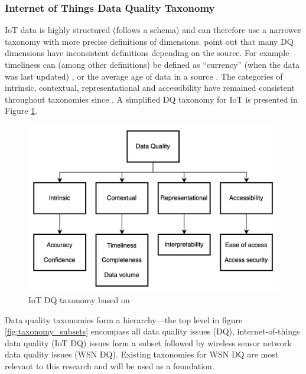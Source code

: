 \subsubsection{Internet of Things Data Quality Taxonomy}
IoT data is highly structured (follows a schema) and can therefore use a narrower taxonomy with more precise definitions of dimensions. \cite{karkouchDataQualityInternet2016} point out that many DQ dimensions have inconsistent definitions depending on the source. For example timeliness can (among other definitions) be defined as “currency” (when the data was last updated) \citep{dasuExploratoryDataMining2003}, or the average age of data in a source \citep{naumannQualitydrivenQueryAnswering2002}. The categories of intrinsic, contextual, representational and accessibility have remained consistent throughout taxonomies since \cite{wangAccuracyWhatData1996}. A simplified DQ taxonomy for IoT is presented in Figure \ref{fig:iot_dq_taxonomy}.

\begin{figure}[h]
    \centering
    \includegraphics[scale=0.15]{figures/literature_review/iot_dq_taxonomy.png}
    \caption{IoT DQ taxonomy based on \cite{karkouchDataQualityInternet2016}}
    \label{fig:iot_dq_taxonomy}
\end{figure}

Data quality taxonomies form a hierarchy---the top level in figure \ref{fig:taxonomy_subsets} encompass all data quality issues (DQ), internet-of-things data quality (IoT DQ) issues form a subset \citep{batiniDataInformationQuality2016} followed by wireless sensor network data quality issues (WSN DQ). Existing taxonomies for WSN DQ are most relevant to this research and will be used as a foundation.

